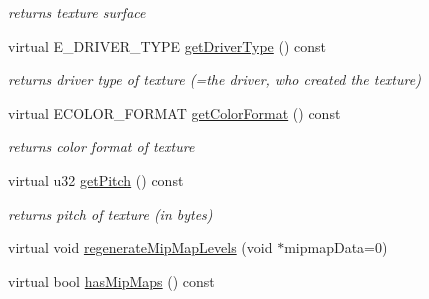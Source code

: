 \begin{DoxyCompactItemize}
\begin{DoxyCompactList}\small\item\em returns texture surface \end{DoxyCompactList}\item 
\hypertarget{classirr_1_1video_1_1_c_software_texture2_aac89714188435707650e8a5bb60a5772}{virtual E\-\_\-\-D\-R\-I\-V\-E\-R\-\_\-\-T\-Y\-P\-E \hyperlink{classirr_1_1video_1_1_c_software_texture2_aac89714188435707650e8a5bb60a5772}{get\-Driver\-Type} () const }\label{classirr_1_1video_1_1_c_software_texture2_aac89714188435707650e8a5bb60a5772}

\begin{DoxyCompactList}\small\item\em returns driver type of texture (=the driver, who created the texture) \end{DoxyCompactList}\item 
\hypertarget{classirr_1_1video_1_1_c_software_texture2_a90747f82dd9fdb4ee6b8d41c34fea6fa}{virtual E\-C\-O\-L\-O\-R\-\_\-\-F\-O\-R\-M\-A\-T \hyperlink{classirr_1_1video_1_1_c_software_texture2_a90747f82dd9fdb4ee6b8d41c34fea6fa}{get\-Color\-Format} () const }\label{classirr_1_1video_1_1_c_software_texture2_a90747f82dd9fdb4ee6b8d41c34fea6fa}

\begin{DoxyCompactList}\small\item\em returns color format of texture \end{DoxyCompactList}\item 
\hypertarget{classirr_1_1video_1_1_c_software_texture2_aa0e9b190025661c6150100e9fa418af9}{virtual u32 \hyperlink{classirr_1_1video_1_1_c_software_texture2_aa0e9b190025661c6150100e9fa418af9}{get\-Pitch} () const }\label{classirr_1_1video_1_1_c_software_texture2_aa0e9b190025661c6150100e9fa418af9}

\begin{DoxyCompactList}\small\item\em returns pitch of texture (in bytes) \end{DoxyCompactList}\item 
virtual void \hyperlink{classirr_1_1video_1_1_c_software_texture2_aa12ba18f895997b0ad49b0725f563b47}{regenerate\-Mip\-Map\-Levels} (void $\ast$mipmap\-Data=0)
\item 
\hypertarget{classirr_1_1video_1_1_c_software_texture2_a6915898811936d97b9113d439f4c2c6a}{virtual bool \hyperlink{classirr_1_1video_1_1_c_software_texture2_a6915898811936d97b9113d439f4c2c6a}{has\-Mip\-Maps} () const }\label{classirr_1_1video_1_1_c_software_texture2_a6915898811936d97b9113d439f4c2c6a}


\end{DoxyCompactItemize}
